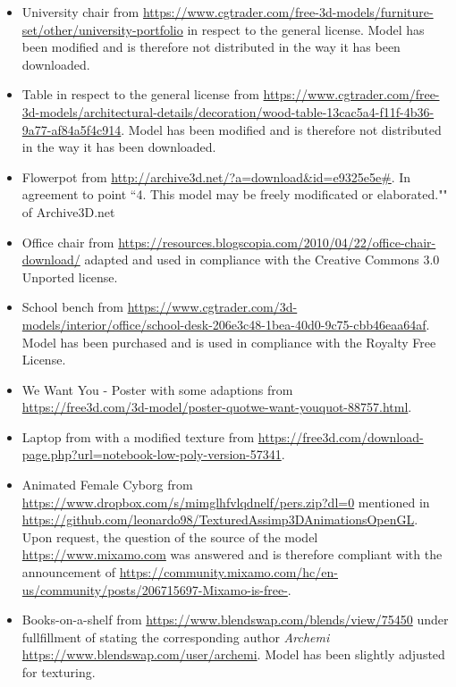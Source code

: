 \documentclass[12pt]{article}
\begin{document}
\begin{itemize}
\item University chair from \url{https://www.cgtrader.com/free-3d-models/furniture-set/other/university-portfolio} in respect to the general license. Model has been modified and is therefore not distributed in the way it has been downloaded.

\item Table in respect to the general license from \url{https://www.cgtrader.com/free-3d-models/architectural-details/decoration/wood-table-13cac5a4-f11f-4b36-9a77-af84a5f4c914}. Model has been modified and is therefore not distributed in the way it has been downloaded.

\item Flowerpot from \url{http://archive3d.net/?a=download\&id=e9325e5e#}. In agreement to point ``4. This model may be freely modificated or elaborated."" of Archive3D.net


\item Office chair from \url{https://resources.blogscopia.com/2010/04/22/office-chair-download/} adapted and used in compliance with the Creative Commons 3.0 Unported license.

\item School bench from
\url{ https://www.cgtrader.com/3d-models/interior/office/school-desk-206e3c48-1bea-40d0-9c75-cbb46eaa64af}. Model has been purchased and is used in compliance with the Royalty Free License.

\item We Want You - Poster with some adaptions from \\ \url{https://free3d.com/3d-model/poster-quotwe-want-youquot-88757.html}.
 
\item Laptop from with a modified texture from 
\url{https://free3d.com/download-page.php?url=notebook-low-poly-version-57341}.
\item Animated Female Cyborg from \url{https://www.dropbox.com/s/mimglhfvlqdnelf/pers.zip?dl=0} mentioned in \url{https://github.com/leonardo98/TexturedAssimp3DAnimationsOpenGL}. Upon request, the question of the  source of the model \url{https://www.mixamo.com} was answered and is therefore compliant with the announcement of \url{https://community.mixamo.com/hc/en-us/community/posts/206715697-Mixamo-is-free-}.

\item Books-on-a-shelf from \url{https://www.blendswap.com/blends/view/75450} under fullfillment of stating the corresponding author \textit{Archemi} \url{https://www.blendswap.com/user/archemi}. Model has been slightly adjusted for texturing.


\end{itemize}
\end{document}
